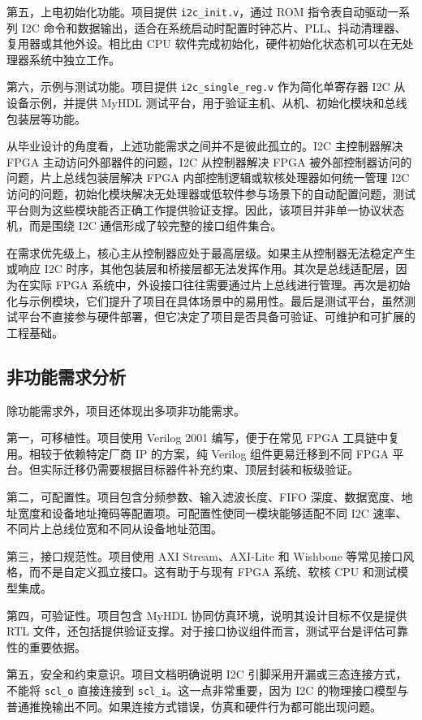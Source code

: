 \documentclass[12pt,a4paper]{article}
\numberwithin{equation}{section}
\begin{document}
第五，上电初始化功能。项目提供 \texttt{i2c\_init.v}，通过 ROM 指令表自动驱动一系列 I2C 命令和数据输出，适合在系统启动时配置时钟芯片、PLL、抖动清理器、复用器或其他外设。相比由 CPU 软件完成初始化，硬件初始化状态机可以在无处理器系统中独立工作。

第六，示例与测试功能。项目提供 \texttt{i2c\_single\_reg.v} 作为简化单寄存器 I2C 从设备示例，并提供 MyHDL 测试平台，用于验证主机、从机、初始化模块和总线包装层等功能。

从毕业设计的角度看，上述功能需求之间并不是彼此孤立的。I2C 主控制器解决 FPGA 主动访问外部器件的问题，I2C 从控制器解决 FPGA 被外部控制器访问的问题，片上总线包装层解决 FPGA 内部控制逻辑或软核处理器如何统一管理 I2C 访问的问题，初始化模块解决无处理器或低软件参与场景下的自动配置问题，测试平台则为这些模块能否正确工作提供验证支撑。因此，该项目并非单一协议状态机，而是围绕 I2C 通信形成了较完整的接口组件集合。

在需求优先级上，核心主从控制器应处于最高层级。如果主从控制器无法稳定产生或响应 I2C 时序，其他包装层和桥接层都无法发挥作用。其次是总线适配层，因为在实际 FPGA 系统中，外设接口往往需要通过片上总线进行管理。再次是初始化与示例模块，它们提升了项目在具体场景中的易用性。最后是测试平台，虽然测试平台不直接参与硬件部署，但它决定了项目是否具备可验证、可维护和可扩展的工程基础。

\subsection{非功能需求分析}

除功能需求外，项目还体现出多项非功能需求。

第一，可移植性。项目使用 Verilog 2001 编写，便于在常见 FPGA 工具链中复用。相较于依赖特定厂商 IP 的方案，纯 Verilog 组件更易迁移到不同 FPGA 平台。但实际迁移仍需要根据目标器件补充约束、顶层封装和板级验证。

第二，可配置性。项目包含分频参数、输入滤波长度、FIFO 深度、数据宽度、地址宽度和设备地址掩码等配置项。可配置性使同一模块能够适配不同 I2C 速率、不同片上总线位宽和不同从设备地址范围。

第三，接口规范性。项目使用 AXI Stream、AXI-Lite 和 Wishbone 等常见接口风格，而不是自定义孤立接口。这有助于与现有 FPGA 系统、软核 CPU 和测试模型集成。

第四，可验证性。项目包含 MyHDL 协同仿真环境，说明其设计目标不仅是提供 RTL 文件，还包括提供验证支撑。对于接口协议组件而言，测试平台是评估可靠性的重要依据。

第五，安全和约束意识。项目文档明确说明 I2C 引脚采用开漏或三态连接方式，不能将 \texttt{scl\_o} 直接连接到 \texttt{scl\_i}。这一点非常重要，因为 I2C 的物理接口模型与普通推挽输出不同。如果连接方式错误，仿真和硬件行为都可能出现问题。
\end{document}
